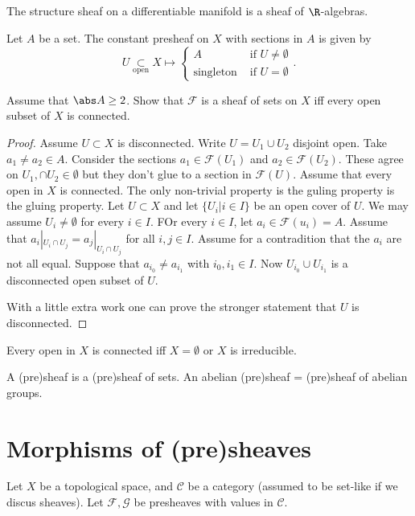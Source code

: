 \begin{example}
	The structure sheaf on a differentiable manifold is a sheaf of $\R$-algebras.
\end{example}
\begin{exercise}
	Let $A$ be a set. 
	The constant presheaf on $X$ with sections in $A$ is given by \[
		U \underset{\text{open}}\subset X \mapsto  \begin{cases}
			A & \text{ if }U \ne \emptyset \\
			\text{singleton} & \text{ if }U = \emptyset
		\end{cases}
	.\] 
	
Assume that $\abs A \ge 2$.  Show that $\mathcal{F}  $ is a sheaf of sets on $X$ iff every open subset of $X$ is connected. 
\end{exercise}\begin{proof}
	\ltr Assume $U \subset X$ is disconnected. Write $U = U_1 \cup  U_2$ disjoint open.
	Take $a_1 \ne a_2 \in A$. Consider the sections $a_1 \in \mathcal{F}(U_1) $ and $a_2 \in \mathcal{F} (U_2)$. 
	These agree on $U_1, \cap U_2 \in \emptyset$ but they don't glue to a section in $\mathcal{F} (U)$.
\rtl
Assume that every open in $X$ is connected.
The only non-trivial property is the guling property is the gluing property.
Let $U \subset X$ and let $\{U_i | i \in I\} $ be an open cover of $U$.
We may assume  $U_i \ne \emptyset $ for every  $i \in I$. FOr every $i  \in I$, let $a_i \in \mathcal{F} (u_i) = A$. 
Assume that $a_i|_{U_i \cap U_j} = a_j|_{U_i \cap U_j}$ for all $i, j \in I$. 
Assume for a contradition that the $a_i $ are not all equal. Suppose that $a_{i_0} \ne a_{i_1}$ with $i_0, i_1 \in I$. 
Now $U_{i_0} \cup U_{i_1}$ is a disconnected open subset of $U$. 


With a little extra work one can prove the stronger statement that $ U$ is disconnected.
\end{proof}
\begin{remark}
	Every open in $X$ is connected iff $X = \emptyset$ or $X$ is irreducible.
\end{remark}
\begin{definition}
	A (pre)sheaf is a (pre)sheaf of sets. An abelian (pre)sheaf =  (pre)sheaf of abelian  groups.
\end{definition}
\section{Morphisms of (pre)sheaves}\label{sec:morphisms_of_(pre)sheaves}
Let $X$ be a topological space, and $\mathcal{C} $ be a category (assumed to be set-like if we discus sheaves).
Let $\mathcal{F} , \mathcal{G}  $ be presheaves with values in $\mathcal{C}$.

